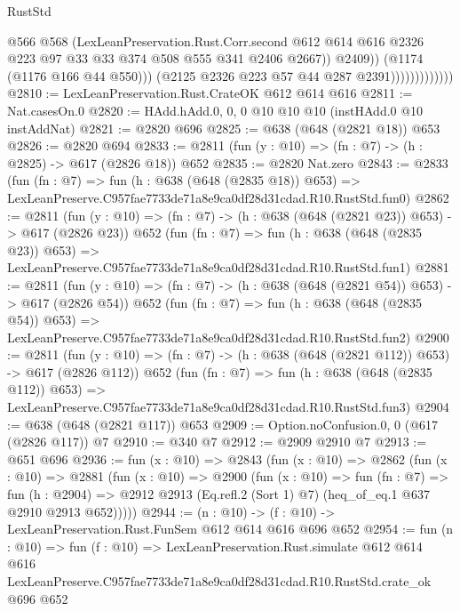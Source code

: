 \begin{lexlean}{RustStd}
\begin{coremodule}
                                    @566
                                    @568
                                    (LexLeanPreservation.Rust.Corr.second
                                      @612
                                      @614
                                      @616
                                      @2326
                                      @223
                                      @97
                                      @33
                                      @33
                                      @374
                                      @508
                                      @555
                                      @341
                                      @2406
                                      @2667))
                                  @2409))
                              (@1174 (@1176 @166 @44 @550)))
                            (@2125 @2326 @223 @57 @44 @287 @2391)))))))))))))
@2810 := LexLeanPreservation.Rust.CrateOK @612 @614 @616
@2811 := Nat.casesOn.{0}
@2820 := HAdd.hAdd.{0, 0, 0} @10 @10 @10 (instHAdd.{0} @10 instAddNat)
@2821 := @2820 @696
@2825 := @638 (@648 (@2821 @18)) @653
@2826 := @2820 @694
@2833 := @2811 (fun (y : @10) => (fn : @7) -> (h : @2825) -> @617 (@2826 @18)) @652
@2835 := @2820 Nat.zero
@2843 := @2833
    (fun (fn : @7) =>
    fun (h : @638 (@648 (@2835 @18)) @653) =>
    LexLeanPreserve.C957fae7733de71a8e9ca0df28d31cdad.R10.RustStd.fun0)
@2862 := @2811
    (fun (y : @10) => (fn : @7) -> (h : @638 (@648 (@2821 @23)) @653) -> @617 (@2826 @23))
    @652
    (fun (fn : @7) =>
    fun (h : @638 (@648 (@2835 @23)) @653) =>
    LexLeanPreserve.C957fae7733de71a8e9ca0df28d31cdad.R10.RustStd.fun1)
@2881 := @2811
    (fun (y : @10) => (fn : @7) -> (h : @638 (@648 (@2821 @54)) @653) -> @617 (@2826 @54))
    @652
    (fun (fn : @7) =>
    fun (h : @638 (@648 (@2835 @54)) @653) =>
    LexLeanPreserve.C957fae7733de71a8e9ca0df28d31cdad.R10.RustStd.fun2)
@2900 := @2811
    (fun (y : @10) => (fn : @7) -> (h : @638 (@648 (@2821 @112)) @653) -> @617 (@2826 @112))
    @652
    (fun (fn : @7) =>
    fun (h : @638 (@648 (@2835 @112)) @653) =>
    LexLeanPreserve.C957fae7733de71a8e9ca0df28d31cdad.R10.RustStd.fun3)
@2904 := @638 (@648 (@2821 @117)) @653
@2909 := Option.noConfusion.{0, 0} (@617 (@2826 @117)) @7
@2910 := @340 @7
@2912 := @2909 @2910 @7
@2913 := @651 @696
@2936 := fun (x : @10) =>
  @2843
    (fun (x : @10) =>
    @2862
      (fun (x : @10) =>
      @2881
        (fun (x : @10) =>
        @2900
          (fun (x : @10) =>
          fun (fn : @7) =>
          fun (h : @2904) =>
          @2912 @2913 (Eq.refl.{2} (Sort 1) @7) (heq_of_eq.{1} @637 @2910 @2913 @652)))))
@2944 := (n : @10) -> (f : @10) -> LexLeanPreservation.Rust.FunSem @612 @614 @616 @696 @652
@2954 := fun (n : @10) =>
  fun (f : @10) =>
  LexLeanPreservation.Rust.simulate
    @612
    @614
    @616
    LexLeanPreserve.C957fae7733de71a8e9ca0df28d31cdad.R10.RustStd.crate_ok
    @696
    @652
\end{coremodule}
\end{lexlean}
